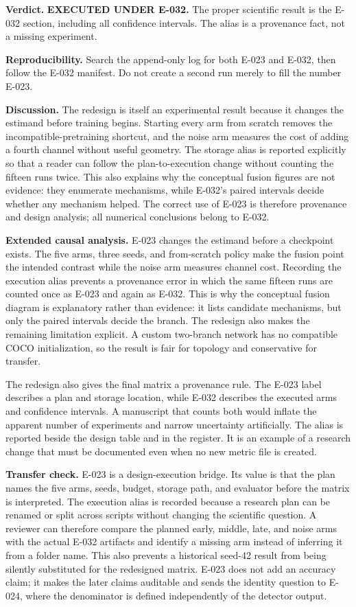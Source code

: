\documentclass[preprint,12pt]{elsarticle}
\begin{document}
\textbf{Verdict.} \textbf{EXECUTED UNDER E-032.} The proper scientific result
is the E-032 section, including all confidence intervals. The alias is a
provenance fact, not a missing experiment.

\textbf{Reproducibility.} Search the append-only log for both E-023 and E-032,
then follow the E-032 manifest. Do not create a second run merely to fill the
number E-023.

\textbf{Discussion.} The redesign is itself an experimental result because it
changes the estimand before training begins. Starting every arm from scratch
removes the incompatible-pretraining shortcut, and the noise arm measures the
cost of adding a fourth channel without useful geometry. The storage alias is
reported explicitly so that a reader can follow the plan-to-execution change
without counting the fifteen runs twice. This also explains why the conceptual
fusion figures are not evidence: they enumerate mechanisms, while E-032's
paired intervals decide whether any mechanism helped. The correct use of
E-023 is therefore provenance and design analysis; all numerical conclusions
belong to E-032.

\textbf{Extended causal analysis.} E-023 changes the estimand before a
checkpoint exists. The five arms, three seeds, and from-scratch policy make
the fusion point the intended contrast while the noise arm measures channel
cost. Recording the execution alias prevents a provenance error in which the
same fifteen runs are counted once as E-023 and again as E-032. This is why the
conceptual fusion diagram is explanatory rather than evidence: it lists
candidate mechanisms, but only the paired intervals decide the branch. The
redesign also makes the remaining limitation explicit. A custom two-branch
network has no compatible COCO initialization, so the result is fair for
topology and conservative for transfer.

The redesign also gives the final matrix a provenance rule. The E-023 label
describes a plan and storage location, while E-032 describes the executed
arms and confidence intervals. A manuscript that counts both would inflate
the apparent number of experiments and narrow uncertainty artificially. The
alias is reported beside the design table and in the register. It is an
example of a research change that must be documented even when no new metric
file is created.

\textbf{Transfer check.} E-023 is a design-execution bridge. Its value is
that the plan names the five arms, seeds, budget, storage path, and evaluator
before the matrix is interpreted. The execution alias is recorded because a
research plan can be renamed or split across scripts without changing the
scientific question. A reviewer can therefore compare the planned early,
middle, late, and noise arms with the actual E-032 artifacts and identify a
missing arm instead of inferring it from a folder name. This also prevents a
historical seed-42 result from being silently substituted for the redesigned
matrix. E-023 does not add an accuracy claim; it makes the later claims
auditable and sends the identity question to E-024, where the denominator is
defined independently of the detector output.
\end{document}
